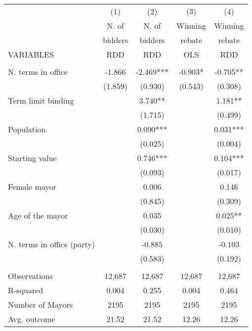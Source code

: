 \documentclass[]{article}
\begin{document}
\begin{tabular}{lcccc} \hline
 & (1) & (2) & (3) & (4) \\
 & N. of & N. of & Winning & Winning \\
 & bidders & bidders & rebate & rebate \\
VARIABLES & RDD & RDD & OLS & RDD \\ \hline
 &  &  &  &  \\
N. terms in office & -1.866 & -2.469*** & -0.903* & -0.705** \\
 & (1.859) & (0.930) & (0.543) & (0.308) \\
Term limit binding &  & 3.740** &  & 1.181** \\
 &  & (1.715) &  & (0.499) \\
Population &  & 0.090*** &  & 0.031*** \\
 &  & (0.025) &  & (0.004) \\
Starting value &  & 0.746*** &  & 0.104*** \\
 &  & (0.093) &  & (0.017) \\
Female mayor &  & 0.006 &  & 0.146 \\
 &  & (0.845) &  & (0.309) \\
Age of the mayor &  & 0.035 &  & 0.025** \\
 &  & (0.030) &  & (0.010) \\
N. terms in office (party) &  & -0.885 &  & -0.103 \\
 &  & (0.583) &  & (0.192) \\
 &  &  &  &  \\
Observations & 12,687 & 12,687 & 12,687 & 12,687 \\
R-squared & 0.004 & 0.255 & 0.004 & 0.464 \\
Number of Mayors & 2195 & 2195 & 2195 & 2195 \\
 Avg. outcome & 21.52 & 21.52 & 12.26 & 12.26 \\ \hline
\end{tabular}
\end{document}
